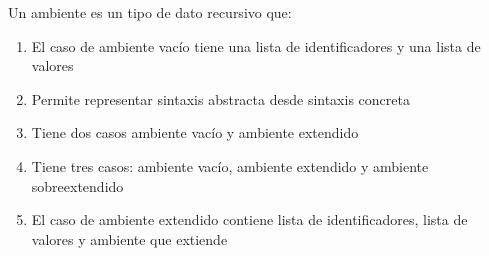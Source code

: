 {
Un ambiente es un tipo de dato recursivo que:
	\begin{enumerate}
		\item El caso de ambiente vacío tiene una lista de identificadores y una lista de valores
		\item Permite representar sintaxis abstracta desde sintaxis concreta
		\item Tiene dos casos ambiente vacío y ambiente extendido %
		\item Tiene tres casos: ambiente vacío, ambiente extendido y ambiente sobreextendido
		\item El caso de ambiente extendido contiene lista de identificadores, lista de valores y ambiente que extiende %
	\end{enumerate}
}
